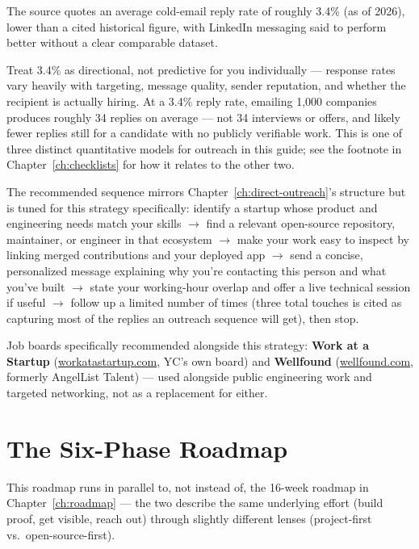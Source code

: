 The source quotes an average cold-email reply rate of roughly 3.4\% (as of 2026), lower than a cited historical
figure, with LinkedIn messaging said to perform better without a clear comparable dataset.

\begin{caution}
Treat 3.4\% as directional, not predictive for you individually — response rates vary heavily with targeting,
message quality, sender reputation, and whether the recipient is actually hiring. At a 3.4\% reply rate, emailing
1,000 companies produces roughly 34 replies on average — not 34 interviews or offers, and likely fewer replies
still for a candidate with no publicly verifiable work. This is one of three distinct quantitative models for
outreach in this guide; see the footnote in Chapter~\ref{ch:checklists} for how it relates to the other two.
\end{caution}

The recommended sequence mirrors Chapter~\ref{ch:direct-outreach}'s structure but is tuned for this strategy
specifically: identify a startup whose product and engineering needs match your skills $\rightarrow$ find a
relevant open-source repository, maintainer, or engineer in that ecosystem $\rightarrow$ make your work easy to
inspect by linking merged contributions and your deployed app $\rightarrow$ send a concise, personalized message
explaining why you're contacting this person and what you've built $\rightarrow$ state your working-hour overlap
and offer a live technical session if useful $\rightarrow$ follow up a limited number of times (three total
touches is cited as capturing most of the replies an outreach sequence will get), then stop.

Job boards specifically recommended alongside this strategy: \textbf{Work at a Startup}
(\url{workatastartup.com}, YC's own board) and \textbf{Wellfound} (\url{wellfound.com}, formerly AngelList
Talent) — used alongside public engineering work and targeted networking, not as a replacement for either.

\section{The Six-Phase Roadmap}

This roadmap runs in parallel to, not instead of, the 16-week roadmap in Chapter~\ref{ch:roadmap} — the two
describe the same underlying effort (build proof, get visible, reach out) through slightly different lenses
(project-first vs.\ open-source-first).

